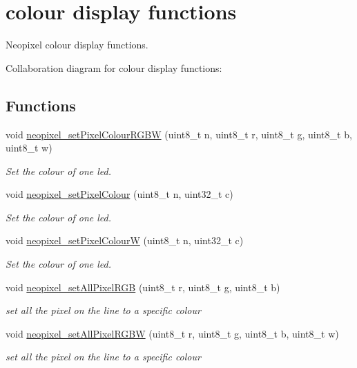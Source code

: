 \hypertarget{group___neo_pixel___display}{}\section{colour display functions}
\label{group___neo_pixel___display}


Neopixel colour display functions.  


Collaboration diagram for colour display functions\+:
\subsection*{Functions}
\begin{DoxyCompactItemize}
\item 
void \hyperlink{group___neo_pixel___display_ga58d5ceb79029ca8dc5dd8b27b65e4f09}{neopixel\+\_\+set\+Pixel\+Colour\+R\+G\+BW} (uint8\+\_\+t n, uint8\+\_\+t r, uint8\+\_\+t g, uint8\+\_\+t b, uint8\+\_\+t w)
\begin{DoxyCompactList}\small\item\em Set the colour of one led. \end{DoxyCompactList}\item 
void \hyperlink{group___neo_pixel___display_gaecbdecac1da356c5fba07058983d9066}{neopixel\+\_\+set\+Pixel\+Colour} (uint8\+\_\+t n, uint32\+\_\+t c)
\begin{DoxyCompactList}\small\item\em Set the colour of one led. \end{DoxyCompactList}\item 
void \hyperlink{group___neo_pixel___display_ga4daf6edfe83394f425ec51f64d92c49c}{neopixel\+\_\+set\+Pixel\+ColourW} (uint8\+\_\+t n, uint32\+\_\+t c)
\begin{DoxyCompactList}\small\item\em Set the colour of one led. \end{DoxyCompactList}\item 
void \hyperlink{group___neo_pixel___display_ga7a6c2dc149e86a788aede1d6aa5262d7}{neopixel\+\_\+set\+All\+Pixel\+R\+GB} (uint8\+\_\+t r, uint8\+\_\+t g, uint8\+\_\+t b)
\begin{DoxyCompactList}\small\item\em set all the pixel on the line to a specific colour \end{DoxyCompactList}\item 
void \hyperlink{group___neo_pixel___display_ga1ba017c1f338ef2c8e4a48acae35d87e}{neopixel\+\_\+set\+All\+Pixel\+R\+G\+BW} (uint8\+\_\+t r, uint8\+\_\+t g, uint8\+\_\+t b, uint8\+\_\+t w)
\begin{DoxyCompactList}\small\item\em set all the pixel on the line to a specific colour \end{DoxyCompactList}\end{DoxyCompactItemize}


